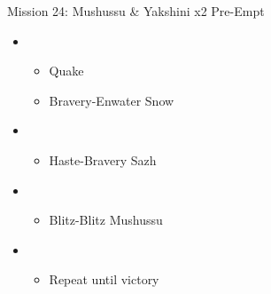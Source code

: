 	\begin{battle}[0:28]{Mission 24: Mushussu \& Yakshini x2 Pre-Empt}
		\begin{itemize}
			\item \third
			      \begin{itemize}
				      \item Quake
				      \item Bravery-Enwater Snow
			      \end{itemize}
			\item \first
			      \begin{itemize}
				      \item Haste-Bravery Sazh
			      \end{itemize}
			\item \sixth
			      \begin{itemize}
				      \item Blitz-Blitz Mushussu
			      \end{itemize}
			\item \fourth
			      \begin{itemize}
				      \item Repeat until victory
			      \end{itemize}
		\end{itemize}
	\end{battle}
\vfill
